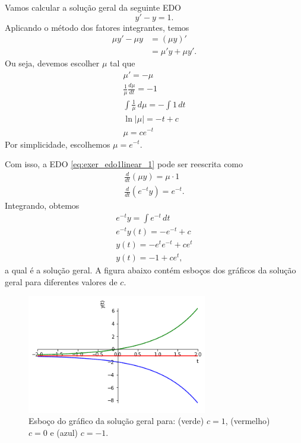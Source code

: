 \begin{ex}
  Vamos calcular a solução geral da seguinte EDO
  \begin{equation}\label{eq:exer_edo1linear_1}
    y' - y = 1. 
  \end{equation}
  Aplicando o método dos fatores integrantes, temos
  \begin{align}
    \mu y' - \mu y &= (\mu y)' \\
    &= \mu' y + \mu y'.
  \end{align}
  Ou seja, devemos escolher $\mu$ tal que
  \begin{gather}
    \mu' = -\mu \\
    \frac{1}{\mu}\frac{d\mu}{dt} = -1 \\
    \int \frac{1}{\mu}\,d\mu = -\int 1\,dt \\
    \ln|\mu| = -t + c \\
    \mu = ce^{-t}
  \end{gather}
  Por simplicidade, escolhemos $\mu = e^{-t}$.

  Com isso, a EDO \eqref{eq:exer_edo1linear_1} pode ser reescrita como
  \begin{gather}
    \frac{d}{dt}\left(\mu y\right) = \mu\cdot 1 \\
    \frac{d}{dt}\left(e^{-t}y\right) = e^{-t}.
  \end{gather}
  Integrando, obtemos
  \begin{gather}
    e^{-t}y = \int e^{-t}\,dt \\
    e^{-t}y(t) = -e^{-t} + c \\
    y(t) = -e^te^{-t} + ce^{t} \\
    y(t) =  -1 + ce^{t},
  \end{gather}
  a qual é a solução geral. A figura abaixo contém esboços dos gráficos da solução geral para diferentes valores de $c$.

  \begin{figure}[H]
    \centering
    \includegraphics[width=0.7\textwidth]{cap_edo1ordem/dados/fig_ex_edo1o_fi/fig_ex_edo1o_fi}
    \caption[Esboço do gráfico da solução geral para diferentes valores de $c$.]{Esboço do gráfico da solução geral para: (verde) $c=1$, (vermelho) $c=0$ e (azul) $c=-1$.}
    \label{fig:ex_edo1o_fi}
  \end{figure}


\end{ex}
